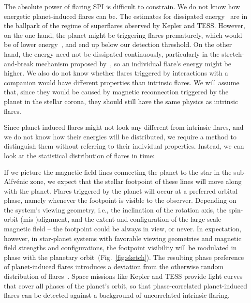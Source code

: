 \documentclass[twocolumn]{aastex631}
\begin{document}
The absolute power of flaring SPI is difficult to constrain. We do not know how energetic planet-induced flares can be. The estimates for dissipated energy~\citep{lanza2018closeby} are in the ballpark of the regime of superflares observed by Kepler and TESS. However, on the one hand, the planet might be triggering flares prematurely, which would be of lower energy~\citep{loyd2023flares}, and end up below our detection threshold. On the other hand, the energy need not be dissipated continuously, particularly in the stretch-and-break mechanism proposed by~\citep{lanza2012starplanet}, so an individual flare's energy might be higher. We also do not know whether flares triggered by interactions with a companion would have different properties than intrinsic flares. We will assume that, since they would be caused by magnetic reconnection triggered by the planet in the stellar corona, they should still have the same physics as intrinsic flares. 

Since planet-induced flares might not look any different from intrinsic flares, and we do not know how their energies will be distributed, we require a method to distinguish them without referring to their individual properties. Instead, we can look at the statistical distribution of flares in time: 

If we picture the magnetic field lines connecting the planet to the star in the sub-Alfv\'enic zone, we expect that the stellar footpoint of these lines will move along with the planet. Flares triggered by the planet will occur at a preferred orbital phase, namely whenever the footpoint is visible to the observer. Depending on the system's viewing geometry, i.e., the inclination of the rotation axis, the spin-orbit (mis-)alignment, and the extent and configuration of the large scale magnetic field -- the footpoint could be always in view, or never. In expectation, however, in star-planet systems with favorable viewing geometries and magnetic field strengths and configurations, the footpoint visibility will be modulated in phase with the planetary orbit~(Fig.~\ref{fig:sketch}). The resulting phase preference of planet-induced flares introduces a deviation from the otherwise random distribution of flares~\citep[see, e.g.,][]{doyle2018investigating,feinstein2020flare,howard2021evryflare}. Space missions like Kepler and TESS provide light curves that cover all phases of the planet's orbit, so that phase-correlated planet-induced flares can be detected against a background of uncorrelated intrinsic flaring. 
\end{document}

